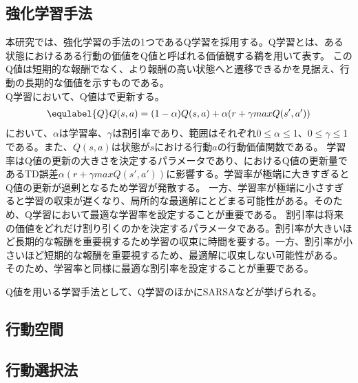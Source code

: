 \subsection{強化学習手法}
本研究では、強化学習の手法の1つであるQ学習を採用する。Q学習とは、ある状態におけるある行動の価値をQ値と呼ばれる価値観する鵜を用いて表す。
このQ値は短期的な報酬でなく、より報酬の高い状態へと遷移できるかを見据え、行動の長期的な価値を示すものである。\\
Q学習において、Q値はで更新する。\\
\begin{eqnarray}
  \equlabel{Q}
  Q(s,a)=(1-\alpha)Q(s,a)+\alpha(r+\gamma maxQ(s',a'))
\end{eqnarray}
において、$\alpha$は学習率、$\gamma$は割引率であり、範囲はそれぞれ0$\leq$$\alpha$$\leq$1、0$\leq$$\gamma$$\leq$1である。また、$Q(s,a)$は状態が$s$における行動$a$の行動価値関数である。
学習率はQ値の更新の大きさを決定するパラメータであり、におけるQ値の更新量であるTD誤差$\alpha(r+\gamma maxQ(s',a'))$に影響する。学習率が極端に大きすぎるとQ値の更新が過剰となるため学習が発散する。
一方、学習率が極端に小さすぎると学習の収束が遅くなり、局所的な最適解にとどまる可能性がある。そのため、Q学習において最適な学習率を設定することが重要である。
割引率は将来の価値をどれだけ割り引くのかを決定するパラメータである。割引率が大きいほど長期的な報酬を重要視するため学習の収束に時間を要する。一方、割引率が小さいほど短期的な報酬を重要視するため、最適解に収束しない可能性がある。
そのため、学習率と同様に最適な割引率を設定することが重要である。

Q値を用いる学習手法として、Q学習のほかにSARSAなどが挙げられる。

\subsection{行動空間}
\subsection{行動選択法}

